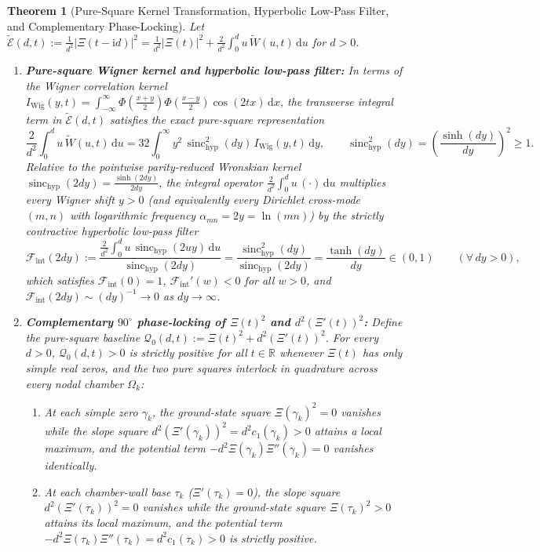 \documentclass[11pt,a4paper,reqno]{amsart}
\newtheorem{theorem}{Theorem}[section]
\theoremstyle{definition}
\theoremstyle{remark}
\numberwithin{equation}{section}
\newcommand{\dd}{\mathrm{d}}
\newcommand{\ii}{\mathrm{i}}
\newcommand{\Wtil}{\widetilde{W}}
\newcommand{\Etil}{\widetilde{\mathcal{E}}}
\newcommand{\sinch}{\operatorname{sinc}_{\mathrm{hyp}}}
\newcommand{\Fint}{\mathcal{F}_{\mathrm{int}}}
\begin{document}
\begin{theorem}[Pure-Square Kernel Transformation, Hyperbolic Low-Pass Filter, and Complementary Phase-Locking]\label{thm:lowpass_and_squares}
Let $\Etil(d,t) := \frac{1}{d^2}|\Xi(t-\ii d)|^2 = \frac{1}{d^2}|\Xi(t)|^2 + \frac{2}{d^2}\int_0^d u\,\Wtil(u,t)\,\dd u$ for $d > 0$.
\begin{enumerate}
\item[\textup{(a)}] \textbf{Pure-square Wigner kernel and hyperbolic low-pass filter:} In terms of the Wigner correlation kernel $I_{\mathrm{Wig}}(y,t) = \int_{-\infty}^\infty \Phi(\frac{x+y}{2})\Phi(\frac{x-y}{2})\cos(2t x)\,\dd x$, the transverse integral term in $\Etil(d,t)$ satisfies the exact pure-square representation
\begin{equation}\label{eq:int_wigner_square}
\frac{2}{d^2}\int_0^d u\,\Wtil(u,t)\,\dd u = 32\int_0^\infty y^2\,\sinch^2(d y)\,I_{\mathrm{Wig}}(y,t)\,\dd y, \qquad \sinch^2(d y) = \left(\frac{\sinh(d y)}{d y}\right)^{\!2} \ge 1.
\end{equation}
Relative to the pointwise parity-reduced Wronskian kernel $\sinch(2d y) = \frac{\sinh(2d y)}{2d y}$, the integral operator $\frac{2}{d^2}\int_0^d u\,(\cdot)\,\dd u$ multiplies every Wigner shift $y > 0$ (and equivalently every Dirichlet cross-mode $(m,n)$ with logarithmic frequency $\alpha_{mn} = 2y = \ln(mn)$) by the strictly contractive hyperbolic low-pass filter
\begin{equation}\label{eq:hyperbolic_lowpass}
\Fint(2d y) := \frac{\frac{2}{d^2}\int_0^d u\,\sinch(2u y)\,\dd u}{\sinch(2d y)} = \frac{\sinch^2(d y)}{\sinch(2d y)} = \frac{\tanh(d y)}{d y} \in (0, 1) \qquad (\forall\, d y > 0),
\end{equation}
which satisfies $\Fint(0) = 1$, $\Fint'(w) < 0$ for all $w > 0$, and $\Fint(2d y) \sim (d y)^{-1} \to 0$ as $d y \to \infty$.
\item[\textup{(b)}] \textbf{Complementary $90^\circ$ phase-locking of $\Xi(t)^2$ and $d^2(\Xi'(t))^2$:} Define the pure-square baseline $\mathcal{Q}_0(d,t) := \Xi(t)^2 + d^2(\Xi'(t))^2$. For every $d > 0$, $\mathcal{Q}_0(d,t) > 0$ is strictly positive for all $t \in \mathbb{R}$ whenever $\Xi(t)$ has only simple real zeros, and the two pure squares interlock in quadrature across every nodal chamber $\Omega_k$:
\begin{enumerate}
\item[\textup{(i)}] At each simple zero $\gamma_k$, the ground-state square $\Xi(\gamma_k)^2 = 0$ vanishes while the slope square $d^2(\Xi'(\gamma_k))^2 = d^2 c_1(\gamma_k) > 0$ attains a local maximum, and the potential term $-d^2\Xi(\gamma_k)\Xi''(\gamma_k) = 0$ vanishes identically.
\item[\textup{(ii)}] At each chamber-wall base $\tau_k$ ($\Xi'(\tau_k) = 0$), the slope square $d^2(\Xi'(\tau_k))^2 = 0$ vanishes while the ground-state square $\Xi(\tau_k)^2 > 0$ attains its local maximum, and the potential term $-d^2\Xi(\tau_k)\Xi''(\tau_k) = d^2 c_1(\tau_k) > 0$ is strictly positive.
\end{enumerate}
\end{enumerate}
\end{theorem}
\end{document}
